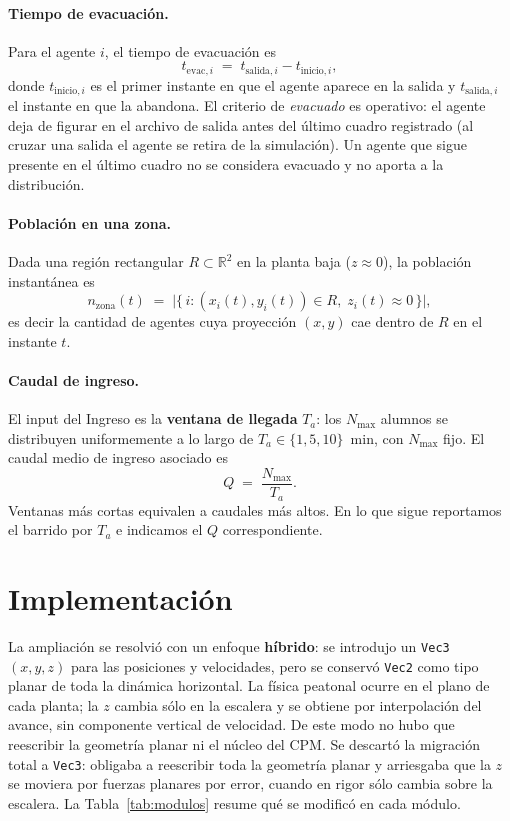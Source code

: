 \documentclass[11pt,a4paper]{article}
\begin{document}
\paragraph{Tiempo de evacuación.}
Para el agente $i$, el tiempo de evacuación es
\begin{equation}
  t_{\text{evac},i} \;=\; t_{\text{salida},i} - t_{\text{inicio},i},
  \label{eq:tevac}
\end{equation}
donde $t_{\text{inicio},i}$ es el primer instante en que el agente aparece en la salida y
$t_{\text{salida},i}$ el instante en que la abandona. El criterio de \emph{evacuado} es
operativo: el agente deja de figurar en el archivo de salida antes del último cuadro
registrado (al cruzar una salida el agente se retira de la simulación). Un agente que sigue
presente en el último cuadro no se considera evacuado y no aporta a la distribución.

\paragraph{Población en una zona.}
Dada una región rectangular $R \subset \mathbb{R}^2$ en la planta baja ($z\approx 0$), la
población instantánea es
\begin{equation}
  n_{\text{zona}}(t) \;=\; \bigl|\{\, i : (x_i(t), y_i(t)) \in R,\; z_i(t) \approx 0 \,\}\bigr|,
  \label{eq:nzona}
\end{equation}
es decir la cantidad de agentes cuya proyección $(x,y)$ cae dentro de $R$ en el instante $t$.

\paragraph{Caudal de ingreso.}
El input del Ingreso es la \textbf{ventana de llegada} $T_a$: los $N_{\max}$ alumnos se
distribuyen uniformemente a lo largo de $T_a \in \{1,5,10\}$~min, con $N_{\max}$ fijo. El
caudal medio de ingreso asociado es
\begin{equation}
  Q \;=\; \frac{N_{\max}}{T_a}.
  \label{eq:caudal}
\end{equation}
Ventanas más cortas equivalen a caudales más altos. En lo que sigue reportamos el barrido por
$T_a$ e indicamos el $Q$ correspondiente.

\section{Implementación}
\label{sec:impl}

La ampliación se resolvió con un enfoque \textbf{híbrido}: se introdujo un \texttt{Vec3}~$(x,y,z)$
para las posiciones y velocidades, pero se conservó \texttt{Vec2} como tipo planar de toda la
dinámica horizontal. La física peatonal ocurre en el plano de cada planta; la $z$ cambia sólo
en la escalera y se obtiene por interpolación del avance, sin componente vertical de velocidad.
De este modo no hubo que reescribir la geometría planar ni el núcleo del CPM. Se descartó la
migración total a \texttt{Vec3}: obligaba a reescribir toda la geometría planar y arriesgaba que
la $z$ se moviera por fuerzas planares por error, cuando en rigor sólo cambia sobre la escalera.
La Tabla~\ref{tab:modulos} resume qué se modificó en cada módulo.
\end{document}
